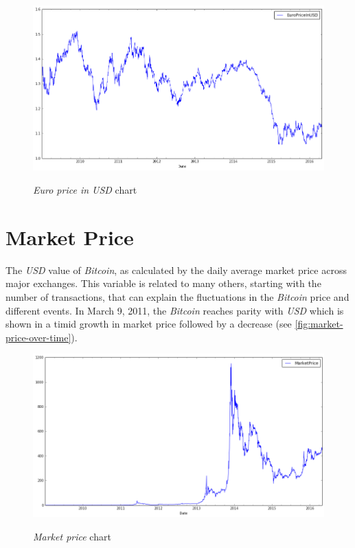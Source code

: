 \begin{figure}[bth]
  \myfloatalign
  {\includegraphics[width=1\linewidth]
    {gfx/euro-price-in-usd-over-time}} 
  \caption{\textit{Euro price in USD} chart}
  \label{fig:euro-price-in-usd-over-time}
\end{figure}


\section{Market Price}
\label{sec:market-price}



The \textit{USD} value of \textit{Bitcoin}, as calculated by the daily
average market price across major exchanges. This variable is related
to many others, starting with the number of transactions, that can
explain the fluctuations in the \textit{Bitcoin} price and different
events. In March 9, 2011, the \textit{Bitcoin} reaches parity with
\textit{USD} which is shown in a timid growth in market price followed
by a decrease (see \autoref{fig:market-price-over-time}).

\begin{figure}[bth]
  \myfloatalign
  {\includegraphics[width=1\linewidth]
    {gfx/market-price-over-time}}
  \caption{\textit{Market price} chart}
  \label{fig:market-price-over-time}
\end{figure}


